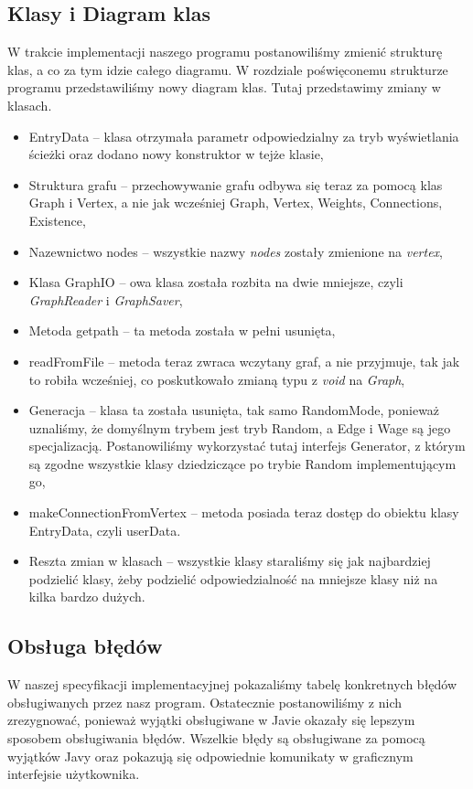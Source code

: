 \documentclass[10pt, a4paper]{report}
\begin{document}
\subsection{Klasy i Diagram klas}\label{subsec:klasy-i-diagram-klas}
W trakcie implementacji naszego programu postanowiliśmy zmienić strukturę klas,
a co za tym idzie całego diagramu. W rozdziale poświęconemu strukturze programu
przedstawiliśmy nowy diagram klas.
Tutaj przedstawimy zmiany w klasach.
\begin{itemize}
  \item EntryData -- klasa otrzymała parametr odpowiedzialny za tryb
        wyświetlania ścieżki oraz dodano nowy konstruktor w tejże klasie,
  \item Struktura grafu -- przechowywanie grafu odbywa się teraz za pomocą klas
        Graph i Vertex, a nie jak wcześniej Graph, Vertex, Weights, Connections,
        Existence,
  \item Nazewnictwo nodes -- wszystkie nazwy \textit{nodes} zostały zmienione
        na \textit{vertex},
  \item Klasa GraphIO -- owa klasa została rozbita na dwie mniejsze, czyli
        \textit{GraphReader} i \textit{GraphSaver},
  \item Metoda getpath -- ta metoda została w pełni usunięta,
  \item readFromFile -- metoda teraz zwraca wczytany graf, a nie przyjmuje, tak
        jak to robiła wcześniej, co poskutkowało zmianą typu z \textit{void} na
        \textit{Graph},
  \item Generacja -- klasa ta została usunięta, tak samo RandomMode, ponieważ
        uznaliśmy, że domyślnym trybem jest tryb Random, a Edge i Wage są jego
        specjalizacją. Postanowiliśmy wykorzystać tutaj interfejs Generator, z którym
        są zgodne wszystkie klasy dziedziczące po trybie Random implementującym go,
  \item makeConnectionFromVertex -- metoda posiada teraz dostęp do obiektu klasy
        EntryData, czyli userData.
  \item Reszta zmian w klasach -- wszystkie klasy staraliśmy się jak
        najbardziej podzielić klasy, żeby podzielić odpowiedzialność na mniejsze klasy
        niż na kilka bardzo dużych.
\end{itemize}

\subsection{Obsługa błędów}\label{subsec:obsługa-błędów}
W naszej specyfikacji implementacyjnej pokazaliśmy tabelę konkretnych błędów
obsługiwanych przez nasz program. Ostatecznie postanowiliśmy z nich
zrezygnować, ponieważ wyjątki obsługiwane w Javie okazały się lepszym
sposobem obsługiwania błędów. Wszelkie błędy są obsługiwane za pomocą wyjątków
Javy oraz pokazują się odpowiednie komunikaty w graficznym interfejsie
użytkownika.
\end{document}
